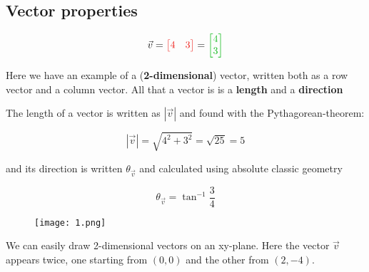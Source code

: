 \documentclass{article}
\begin{document}
\subsection{Vector properties}

\begin{align*}
\vec{v}  = \color{rooj} \begin{bmatrix} 4 & 3 \end{bmatrix}  \color{black}
 =  \color{groen} \begin{bmatrix} 4 \\ 3 \end{bmatrix}  \color{black}
\end{align*}

Here we have an example of  a (\textbf{2-dimensional}) vector, written both as a \color{rooj} row vector \color{black} and a \color{groen} column vector\color{black}.
All that a vector is is a \textbf{length} and a \textbf{direction}


The length of a vector is written as $|\vec{v}|$ and found with the Pythagorean-theorem:

\[
|\vec{v}| = \sqrt{4^2 + 3^2} = \sqrt{25} = 5
\]

and its direction is written $\theta_{\vec{v}}$ and calculated using absolute classic geometry

\[
\theta_{\vec{v}} = \tan^{-1}\frac{3}{4} 
\]

\begin{minipage}{0.45\textwidth}
\begin{figure}[H]
\texttt{[image: 1.png]}
\end{figure}
\end{minipage} \hfill
\begin{minipage}{0.55\textwidth}
\begin{flushleft}
We can easily draw 2-dimensional vectors on an xy-plane. Here the vector $\vec{v}$ appears twice, one starting from $(0,0)$ and the other from $(2,-4)$.
\end{flushleft}
\end{minipage}
\end{document}
